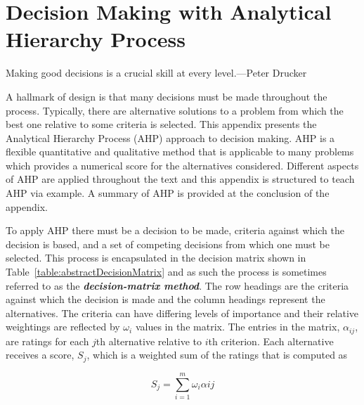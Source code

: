 
\chapter{Decision Making with Analytical Hierarchy Process}
\label{appendix:DecisionMakingAHP}
\graphicspath{ {./appendixB/Fig} }

\begin{itquote}
Making good decisions is a crucial skill at every level.---Peter Drucker
\end{itquote}

A hallmark of design is that many decisions must be made throughout the
process. Typically, there are alternative solutions to a problem from
which the best one relative to some criteria is selected. This appendix
presents the Analytical Hierarchy Process (AHP) approach to decision
making. AHP is a flexible quantitative and qualitative method that is
applicable to many problems which provides a numerical score for the
alternatives considered. Different aspects of AHP are applied throughout
the text and this appendix is structured to teach AHP via example. A
summary of AHP is provided at the conclusion of the appendix.

To apply AHP there must be a decision to be made, criteria against which
the decision is based, and a set of competing decisions from which one
must be selected. This process is encapsulated in the decision matrix
shown in Table~\ref{table:abstractDecisionMatrix} and as such the process is sometimes referred to as
the \emph{\textbf{decision-matrix method}}. The row headings are the
criteria against which the decision is made and the column headings
represent the alternatives. The criteria can have differing levels of
importance and their relative weightings are reflected by
$\omega_{i}$ values in the matrix. The entries
in the matrix, $\alpha_{ij}$, are ratings for each $j$th alternative relative to
$i$th criterion. Each alternative receives a score, $S_{j}$, which is a weighted sum of the ratings
that is computed as

\begin{equation}
\label{equ:decisionMatrix}
S_{j} = \sum_{i=1}^{m} \omega_{i}\alpha{ij}
\end{equation}


